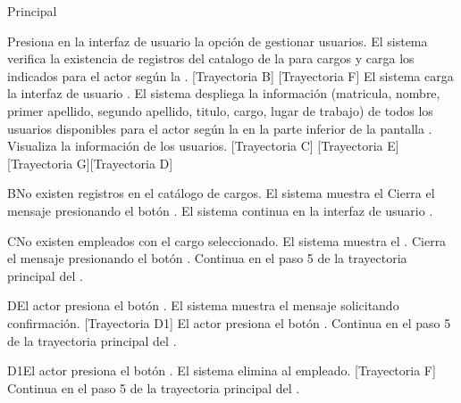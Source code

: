 \begin{UCtrayectoria}{Principal}
	
	\UCpaso[\UCactor] Presiona en la interfaz de usuario  la opción de gestionar usuarios. 
	\UCpaso  El sistema verifica la existencia de registros del catalogo de la  para cargos  y carga los indicados para el actor según la  . [Trayectoria B] [Trayectoria F] 
	\UCpaso El sistema carga la interfaz de usuario  .
	\UCpaso El sistema despliega la información (matricula,  nombre, primer apellido, segundo apellido, titulo, cargo, lugar de trabajo) de todos los usuarios disponibles para el actor según la   en la parte inferior de la pantalla .
	\UCpaso [\UCactor] Visualiza la información de los usuarios.  [Trayectoria C] [Trayectoria E] [Trayectoria G][Trayectoria D]
\end{UCtrayectoria}

\begin{UCtrayectoriaA}{B}{No existen registros en el catálogo de cargos.}
	\UCpaso     El sistema muestra el 	
	\UCpaso[\UCactor] Cierra el mensaje presionando el botón .
	\UCpaso  El sistema continua en la interfaz de usuario .
\end{UCtrayectoriaA}

\begin{UCtrayectoriaA}{C}{No existen  empleados con el cargo seleccionado.}
	\UCpaso     El sistema muestra el .
	\UCpaso[\UCactor] Cierra el mensaje presionando el botón .
	\UCpaso Continua en el paso 5 de la trayectoria principal del .
\end{UCtrayectoriaA}


\begin{UCtrayectoriaA}{D}{El actor presiona el botón .}
	\UCpaso El sistema muestra el mensaje  solicitando confirmación. [Trayectoria D1]
	\UCpaso[\UCactor] El actor presiona el botón .
	\UCpaso Continua en el paso 5 de la trayectoria principal del .  	
\end{UCtrayectoriaA}

\begin{UCtrayectoriaA}{D1}{El actor presiona el botón .}
	\UCpaso     El sistema elimina al empleado. [Trayectoria F] 
	\UCpaso Continua en el paso 5 de la trayectoria principal del .  
\end{UCtrayectoriaA}


